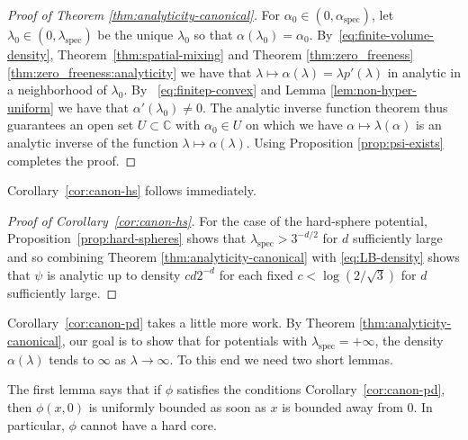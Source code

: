 \documentclass[10pt]{amsart}
\theoremstyle{definition}
\theoremstyle{remark}
\newcommand{\spec}{{\mathrm{spec}}}
\newcommand{\C}{\mathbb{C}}
\begin{document}
	
	
	\begin{proof}[Proof of Theorem \ref{thm:analyticity-canonical}]
		For $\alpha_0 \in (0,\alpha_\spec)$, let $\lambda_0 \in (0,\lambda_\spec)$ be the unique $\lambda_0$ so that $\alpha(\lambda_0) = \alpha_0$.  By~\eqref{eq:finite-volume-density}, Theorem~\ref{thm:spatial-mixing} and Theorem \ref{thm:zero_freeness}\ref{thm:zero_freeness:analyticity} we have that $\lambda \mapsto \alpha(\lambda) = \lambda p'(\lambda)$ in analytic in a neighborhood of $\lambda_0$.  By ~\eqref{eq:finitep-convex} and Lemma \ref{lem:non-hyper-uniform} we have that $\alpha'(\lambda_0) \neq 0$.  The analytic inverse function theorem thus guarantees an open set $U \subset \C$ with $\alpha_0 \in U$ on which we have $\alpha \mapsto \lambda(\alpha)$ is an analytic inverse of the function $\lambda \mapsto \alpha(\lambda)$.  Using Proposition \ref{prop:psi-exists} completes the proof.
	\end{proof}
	
	Corollary~\ref{cor:canon-hs} follows immediately.
	
	\begin{proof}[Proof of Corollary~\ref{cor:canon-hs}]
		For the case of the hard-sphere potential, Proposition~\ref{prop:hard-spheres} shows that $\lambda_\spec>3^{-d/2}$ for $d$ sufficiently large and so combining Theorem \ref{thm:analyticity-canonical} with \eqref{eq:LB-density} shows that $\psi$ is analytic up to density $c d 2^{-d}$ for each fixed $c < \log(2/\sqrt{3})$ for $d$ sufficiently large.
	\end{proof}
	
	Corollary~\ref{cor:canon-pd} takes a little more work. By Theorem \ref{thm:analyticity-canonical}, our goal is to show that for potentials with $\lambda_\spec=+\infty$, the density $\alpha(\lambda)$ tends to $\infty$ as $\lambda\to\infty$. To this end we need two short lemmas.
	
	The first lemma says that if $\phi$ satisfies the conditions Corollary~\ref{cor:canon-pd}, then $\phi(x,0)$ is uniformly bounded as soon as $x$ is bounded away from $0$. In particular, $\phi$ cannot have a hard core.   
	
\end{document}
